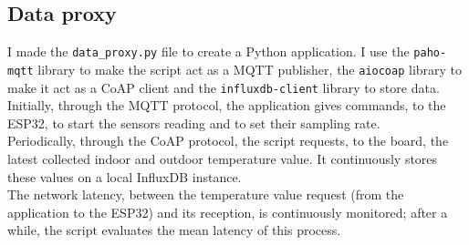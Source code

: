 \documentclass[conference]{IEEEtran}
\begin{document}
\subsection{Data proxy}
I made the \texttt{data\_proxy.py} file to create a Python application. I use the \texttt{paho-mqtt} library to make the script act as a MQTT publisher, the \texttt{aiocoap} library to make it act as a CoAP client and the \texttt{influxdb-client} library to store data.\\
Initially, through the MQTT protocol, the application gives commands, to the ESP32, to start the sensors reading and to set their sampling rate.\\
Periodically, through the CoAP protocol, the script requests, to the board, the latest collected indoor and outdoor temperature value. It continuously stores these values on a local InfluxDB instance.\\
The network latency, between the temperature value request (from the application to the ESP32) and its reception, is continuously monitored; after a while, the script evaluates the mean latency of this process.
\end{document}
